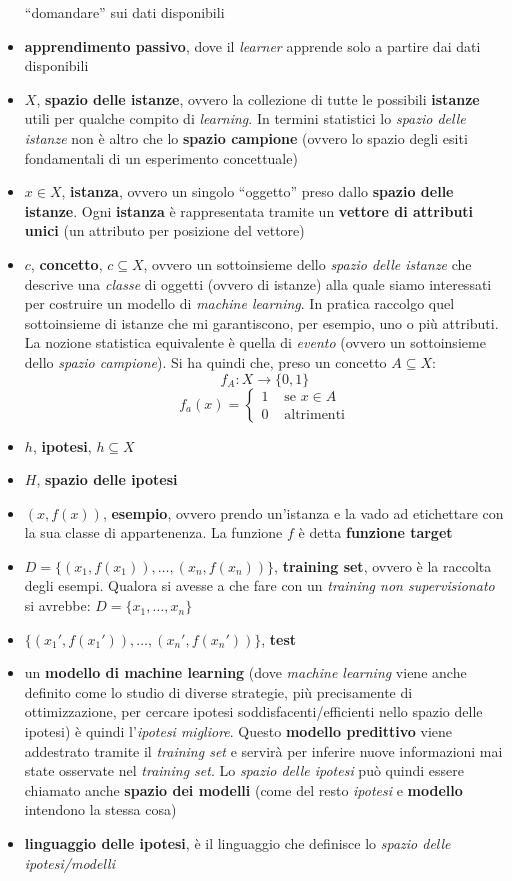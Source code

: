 \documentclass[a4paper,12pt, oneside]{article}
\begin{document}
\begin{itemize}
  ``domandare'' sui dati 
  disponibili 
  \item \textbf{apprendimento passivo}, dove il \textit{learner} apprende solo a
  partire dai dati disponibili
  \item $X$, \textbf{spazio delle istanze}, ovvero la collezione di tutte le
  possibili \textbf{istanze} utili per qualche compito di
  \textit{learning}. In termini statistici lo \textit{spazio delle istanze}
  non è altro che lo \textbf{spazio campione} (ovvero lo spazio degli esiti
  fondamentali di un esperimento concettuale)
  \item $x\in X$, \textbf{istanza}, ovvero un singolo ``oggetto'' preso dallo
  \textbf{spazio delle istanze}. Ogni \textbf{istanza} è rappresentata tramite
  un \textbf{vettore di attributi unici} (un attributo per posizione del
  vettore)
  \item $c$, \textbf{concetto}, $c\subseteq X$, ovvero un sottoinsieme dello
  \textit{spazio delle istanze} che descrive una \textit{classe} di oggetti
  (ovvero di istanze) alla quale siamo interessati per costruire un modello di
  \textit{machine learning}. In pratica raccolgo quel sottoinsieme di istanze
  che mi garantiscono, per esempio, uno o più attributi. La nozione statistica
  equivalente è quella di \textit{evento} (ovvero un sottoinsieme dello
  \textit{spazio campione}). Si ha quindi che, preso un concetto $A\subseteq
  X$:
  \[f_A:X\to\{0,1\}\]
  \[f_a(x)=
    \begin{cases}
      1& \mbox{ se } x\in A\\
      0& \mbox{ altrimenti}
    \end{cases}
  \]
  \item $h$, \textbf{ipotesi}, $h\subseteq X$
  \item $H$, \textbf{spazio delle ipotesi}
  \item $(x, f(x))$, \textbf{esempio},
  ovvero prendo un'istanza e la vado ad etichettare con la sua classe di
  appartenenza. La funzione $f$ è detta \textbf{funzione target}
  \item $D=\{(x_1,f(x_1)),\ldots,(x_n,f(x_n))\}$, \textbf{training set},
  ovvero è la raccolta degli esempi. Qualora si avesse a che fare con un 
  \textit{training non supervisionato} si avrebbe:
  $D=\{x_1,\ldots,x_n\}$
  \item $\{(x_1',f(x_1')),\ldots,(x_n',f(x_n'))\}$, \textbf{test}
  \item un \textbf{modello di machine learning} (dove \textit{machine
    learning} viene anche definito come lo studio di diverse strategie, più
  precisamente di ottimizzazione, per
  cercare ipotesi soddisfacenti/efficienti nello spazio delle ipotesi) è
  quindi l'\textit{ipotesi migliore}. Questo \textbf{modello predittivo} viene
  addestrato tramite il \textit{training set} e servirà per inferire nuove
  informazioni mai state osservate nel \textit{training set}. Lo
  \textit{spazio delle ipotesi} può quindi essere chiamato anche
  \textbf{spazio dei modelli} (come del resto \textit{ipotesi} e
  \textbf{modello} intendono la stessa cosa)
  \item \textbf{linguaggio delle ipotesi}, è il linguaggio che definisce lo
  \textit{spazio delle ipotesi/modelli}
  

\end{itemize}
\end{document}

